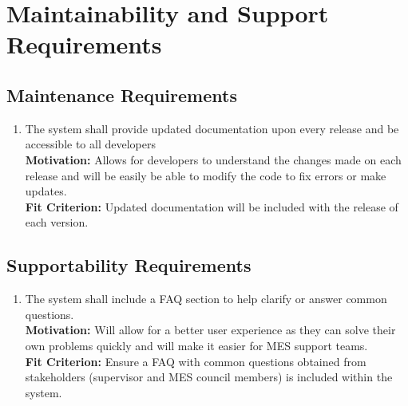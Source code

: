 \documentclass[12pt]{article}
\begin{document}
\section{Maintainability and Support Requirements}
\subsection{Maintenance Requirements}
\begin{enumerate}[align=left,
  leftmargin=*,
  labelsep=1em,
  itemindent=0em,
  label=\bfseries MT-\arabic*:,
  ref=\bfseries MT-\arabic*]
  \item \label{MSMR1} The system shall provide updated documentation upon every release and be accessible to all developers\\[2mm]
    {\bf Motivation:} Allows for developers to understand the changes made on each release and will be easily be able to modify the code to fix errors or make updates. \\
    {\bf Fit Criterion:} Updated documentation will be included with the release of each version.
\end{enumerate}
\subsection{Supportability Requirements}
\begin{enumerate}[align=left,
  leftmargin=*,
  labelsep=1em,
  itemindent=0em,
  label=\bfseries SU-\arabic*:,
  ref=\bfseries SU-\arabic*]
  \item \label{MSSR1} The system shall include a FAQ section to help clarify or answer common questions.\\[2mm]
    {\bf Motivation:} Will allow for a better user experience as they can solve their own problems quickly and will make it easier for MES support teams. \\
    {\bf Fit Criterion:} Ensure a FAQ with common questions obtained from stakeholders (supervisor and MES council members) is included within the system.
\end{enumerate}
\end{document}
